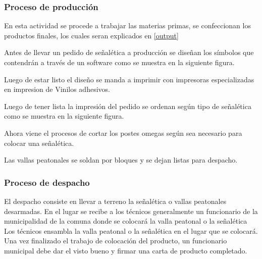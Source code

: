 	\subsubsection{Proceso de producción}		  
	
En esta actividad se procede a trabajar las materias primas, se confeccionan los productos finales, los cuales seran explicados en \ref{output}

Antes de llevar un pedido de señalética a producción se diseñan los símbolos que contendrán a través de un software como se muestra en la siguiente figura.
\vspace{5mm}

Luego de estar listo el diseño se manda a imprimir con impresoras especializadas en impresion de Vinilos adhesivos.


Luego de tener lista la impresión del pedido se ordenan según tipo de señalética como se muestra en la siguiente figura.
\vspace{5mm}

Ahora viene el procesos de cortar los postes omegas según sea necesario para colocar una señalética.

Las vallas peatonales se soldan por bloques y se dejan listas para despacho.


	\subsubsection{Proceso de despacho}
	
	El despacho consiste en llevar a terreno la señalética o vallas peatonales desarmadas.  En el lugar se recibe a los técnicos generalmente un funcionario de la municipalidad de la comuna donde se colocará la valla peatonal o la señalética
Los técnicos ensambla la valla peatonal o la señalética en el lugar que se colocará.
Una vez finalizado el trabajo de colocación del producto, un funcionario municipal debe dar el visto bueno y firmar una carta de producto completado.



	
